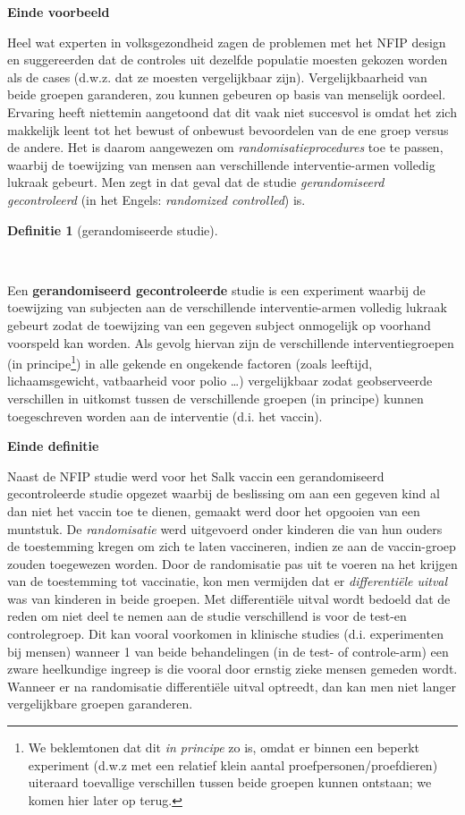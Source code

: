 \documentclass[
  dutch,
  letterpaper,
  12pt]{book}
\theoremstyle{definition}
\theoremstyle{definition}
\newtheorem{definition}{Definitie}[chapter]
\theoremstyle{definition}
\theoremstyle{remark}
\begin{document}
\textbf{Einde voorbeeld}

Heel wat experten in volksgezondheid zagen de problemen met het NFIP
design en suggereerden dat de controles uit dezelfde populatie moesten
gekozen worden als de cases (d.w.z. dat ze moesten vergelijkbaar zijn).
Vergelijkbaarheid van beide groepen garanderen, zou kunnen gebeuren op
basis van menselijk oordeel. Ervaring heeft niettemin aangetoond dat dit
vaak niet succesvol is omdat het zich makkelijk leent tot het bewust of
onbewust bevoordelen van de ene groep versus de andere. Het is daarom
aangewezen om \emph{randomisatieprocedures} toe te passen, waarbij de
toewijzing van mensen aan verschillende interventie-armen volledig
lukraak gebeurt. Men zegt in dat geval dat de studie
\emph{gerandomiseerd gecontroleerd} (in het Engels: \emph{randomized
controlled}) is.

\begin{definition}[gerandomiseerde
studie]\protect\hypertarget{def-gerandomiseerde-studie}{}\label{def-gerandomiseerde-studie}

~

\end{definition}

Een \textbf{gerandomiseerd gecontroleerde} studie is een experiment
waarbij de toewijzing van subjecten aan de verschillende
interventie-armen volledig lukraak gebeurt zodat de toewijzing van een
gegeven subject onmogelijk op voorhand voorspeld kan worden. Als gevolg
hiervan zijn de verschillende interventiegroepen (in
principe\footnote{We beklemtonen dat dit \emph{in principe} zo is, omdat
  er binnen een beperkt experiment (d.w.z met een relatief klein aantal
  proefpersonen/proefdieren) uiteraard toevallige verschillen tussen
  beide groepen kunnen ontstaan; we komen hier later op terug.}) in alle
gekende en ongekende factoren (zoals leeftijd, lichaamsgewicht,
vatbaarheid voor polio \ldots) vergelijkbaar zodat geobserveerde
verschillen in uitkomst tussen de verschillende groepen (in principe)
kunnen toegeschreven worden aan de interventie (d.i. het vaccin).

\textbf{Einde definitie}

Naast de NFIP studie werd voor het Salk vaccin een gerandomiseerd
gecontroleerde studie opgezet waarbij de beslissing om aan een gegeven
kind al dan niet het vaccin toe te dienen, gemaakt werd door het
opgooien van een muntstuk. De \emph{randomisatie} werd uitgevoerd onder
kinderen die van hun ouders de toestemming kregen om zich te laten
vaccineren, indien ze aan de vaccin-groep zouden toegewezen worden. Door
de randomisatie pas uit te voeren na het krijgen van de toestemming tot
vaccinatie, kon men vermijden dat er \emph{differentiële uitval} was van
kinderen in beide groepen. Met differentiële uitval wordt bedoeld dat de
reden om niet deel te nemen aan de studie verschillend is voor de
test-en controlegroep. Dit kan vooral voorkomen in klinische studies
(d.i. experimenten bij mensen) wanneer 1 van beide behandelingen (in de
test- of controle-arm) een zware heelkundige ingreep is die vooral door
ernstig zieke mensen gemeden wordt. Wanneer er na randomisatie
differentiële uitval optreedt, dan kan men niet langer vergelijkbare
groepen garanderen.
\end{document}
